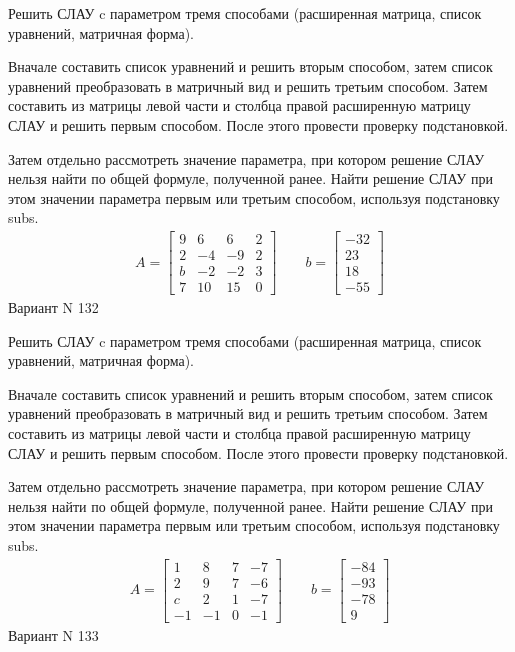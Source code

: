 \documentclass[11pt]{report}
\begin{document}
Решить СЛАУ c параметром тремя способами (расширенная матрица, список уравнений, матричная форма).

Вначале составить список уравнений и решить вторым способом,
затем список уравнений преобразовать в матричный вид и решить третьим способом.
Затем составить из матрицы левой части и столбца правой расширенную матрицу СЛАУ и решить первым способом.
После этого провести проверку подстановкой.

Затем отдельно рассмотреть значение параметра, при котором решение СЛАУ нельзя найти по общей формуле,
полученной ранее.
Найти решение СЛАУ при этом значении параметра первым или третьим способом, используя подстановку subs.
\begin{align*}
    A = \left[\begin{matrix}9 & 6 & 6 & 2\\2 & -4 & -9 & 2\\b & -2 & -2 & 3\\7 & 10 & 15 & 0\end{matrix}\right]
\qquad b = \left[\begin{matrix}-32\\23\\18\\-55\end{matrix}\right]
\end{align*}
\newpage
Вариант N 132


Решить СЛАУ c параметром тремя способами (расширенная матрица, список уравнений, матричная форма).

Вначале составить список уравнений и решить вторым способом,
затем список уравнений преобразовать в матричный вид и решить третьим способом.
Затем составить из матрицы левой части и столбца правой расширенную матрицу СЛАУ и решить первым способом.
После этого провести проверку подстановкой.

Затем отдельно рассмотреть значение параметра, при котором решение СЛАУ нельзя найти по общей формуле,
полученной ранее.
Найти решение СЛАУ при этом значении параметра первым или третьим способом, используя подстановку subs.
\begin{align*}
    A = \left[\begin{matrix}1 & 8 & 7 & -7\\2 & 9 & 7 & -6\\c & 2 & 1 & -7\\-1 & -1 & 0 & -1\end{matrix}\right]
\qquad b = \left[\begin{matrix}-84\\-93\\-78\\9\end{matrix}\right]
\end{align*}
\newpage
Вариант N 133
\end{document}
